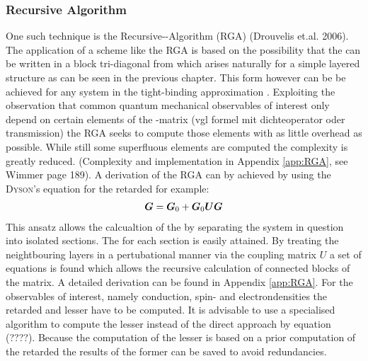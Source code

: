 \subsubsection{Recursive \gfnc{} Algorithm}
One such technique is the Recursive-\gfnc-Algorithm (RGA) (Drouvelis et.al. 2006)\cite{MacKinnon1985}.
The application of a scheme like the RGA is based on the possibility that the \hamil{} can be written in a block tri-diagonal from which arises naturally for a simple layered structure as can be seen in the previous chapter. This form however can be be achieved for any system in the tight-binding approximation \cite{Wimmer2009Thesis}.
Exploiting the observation that common quantum mechanical observables of interest only depend on certain elements of the \gfnc-matrix (vgl formel mit dichteoperator oder transmission) the RGA seeks to compute those elements with as little overhead as possible. While still some superfluous elements are computed the complexity is greatly reduced. (Complexity and implementation in Appendix \ref{app:RGA}, see Wimmer page 189). A derivation of the RGA can by achieved by using the \textsc{Dyson}'s equation for the retarded \gfnc{} for example:
\begin{align}
	\boldsymbol{G} = \boldsymbol{G}_0+\boldsymbol{G}_0\boldsymbol{U}\boldsymbol{G}
	\label{eqn:DysonEquationG}
\end{align}
This ansatz allows the calcualtion of the \gfnc{} by separating the system in question into isolated sections. The \gfnc{} for each section is easily attained. By treating the neightbouring layers in a pertubational manner via the coupling matrix $U$ a set of equations is found which allows the recursive calculation of connected blocks of the \gfnc{} matrix. A detailed derivation can be found in Appendix \ref{app:RGA}.
For the observables of interest, namely conduction, spin- and electrondensities the retarded and lesser \gfnc{} have to be computed.
It is advisable to use a specialised algorithm to compute the lesser \gfnc{} instead of the direct approach by equation (????). Because the computation of the lesser \gfnc{} is based on a prior computation of the retarded \gfnc{} the results of the former can be saved to avoid redundancies.

